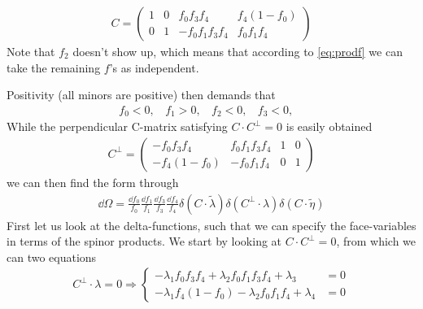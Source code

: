 \documentclass[a4paper,12pt]{article}
\begin{document}
\begin{equation}
	\begin{aligned}
		C=
		\begin{pmatrix}
			1 & 0 & f_0f_3f_4 & f_4(1-f_0)\\
			0 & 1 & -f_0f_1f_3f_4&f_0f_1f_4
		\end{pmatrix}
	\end{aligned}
\end{equation}
Note that $f_2$ doesn't show up, which means that according to \eqref{eq:prodf} we can take the remaining $f$'s as independent.

Positivity (all minors are positive) then demands that
\begin{equation}
	\begin{aligned}
		f_0<0,~~~~f_1>0,~~~~f_2<0,~~~~f_3<0,~~~~
	\end{aligned}
\end{equation}
While the perpendicular C-matrix satisfying $C\cdot C^\perp=0$ is easily obtained
\begin{equation}
	\begin{aligned}
		C^\perp=
		\begin{pmatrix}
		 -f_0f_3f_4 &f_0f_1f_3f_4 & 1 & 0\\
		-f_4(1-f_0) &-f_0f_1f_4 & 0 & 1
		\end{pmatrix}
	\end{aligned}
\end{equation}
we can then find the form through
\begin{equation}
	\begin{aligned}
		\dd \Omega =\frac{\dd f_0}{f_0}\frac{\dd f_1}{f_1}\frac{\dd f_3}{f_3}\frac{\dd f_4}{f_4}\delta(C\cdot \tilde \lambda) \delta(C^\perp\cdot \lambda)\delta(C\cdot \tilde \eta)
	\end{aligned}
\end{equation}
First let us look at the delta-functions, such that we can specify the face-variables in terms of the spinor products. We start by looking at $C\cdot C^\perp=0$, from which we can two equations
\begin{equation}
	\begin{aligned}
		C^\perp\cdot \lambda=0\Rightarrow\begin{cases}
			-\lambda_1f_0f_3f_4+\lambda_2 f_0f_1f_3f_4+ \lambda_3&=0\\
			-\lambda_1f_4(1-f_0)-\lambda_2f_0f_1f_4+ \lambda_4&=0
		\end{cases}
	\end{aligned}
\end{equation}
\end{document}
